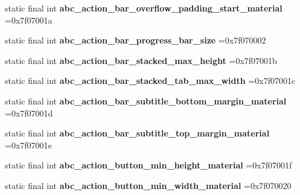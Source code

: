 \begin{DoxyCompactItemize}
\item 
\hypertarget{classcheck_1_1test_1_1_r_1_1dimen_ad969da99713b581daab3061d6db8a49b}{}static final int {\bfseries abc\+\_\+action\+\_\+bar\+\_\+overflow\+\_\+padding\+\_\+start\+\_\+material} =0x7f07001a\label{classcheck_1_1test_1_1_r_1_1dimen_ad969da99713b581daab3061d6db8a49b}

\item 
\hypertarget{classcheck_1_1test_1_1_r_1_1dimen_a2d21081705d41c257d4572203da96a5a}{}static final int {\bfseries abc\+\_\+action\+\_\+bar\+\_\+progress\+\_\+bar\+\_\+size} =0x7f070002\label{classcheck_1_1test_1_1_r_1_1dimen_a2d21081705d41c257d4572203da96a5a}

\item 
\hypertarget{classcheck_1_1test_1_1_r_1_1dimen_aee9ed59153261299d47b8fa9679c329e}{}static final int {\bfseries abc\+\_\+action\+\_\+bar\+\_\+stacked\+\_\+max\+\_\+height} =0x7f07001b\label{classcheck_1_1test_1_1_r_1_1dimen_aee9ed59153261299d47b8fa9679c329e}

\item 
\hypertarget{classcheck_1_1test_1_1_r_1_1dimen_ad12adb5628a570288d2af64a4c55f616}{}static final int {\bfseries abc\+\_\+action\+\_\+bar\+\_\+stacked\+\_\+tab\+\_\+max\+\_\+width} =0x7f07001c\label{classcheck_1_1test_1_1_r_1_1dimen_ad12adb5628a570288d2af64a4c55f616}

\item 
\hypertarget{classcheck_1_1test_1_1_r_1_1dimen_a35b1ac0612787f9c8948ff2e29625a13}{}static final int {\bfseries abc\+\_\+action\+\_\+bar\+\_\+subtitle\+\_\+bottom\+\_\+margin\+\_\+material} =0x7f07001d\label{classcheck_1_1test_1_1_r_1_1dimen_a35b1ac0612787f9c8948ff2e29625a13}

\item 
\hypertarget{classcheck_1_1test_1_1_r_1_1dimen_ad0d350a19b1df248b6dfd44f41b33ce2}{}static final int {\bfseries abc\+\_\+action\+\_\+bar\+\_\+subtitle\+\_\+top\+\_\+margin\+\_\+material} =0x7f07001e\label{classcheck_1_1test_1_1_r_1_1dimen_ad0d350a19b1df248b6dfd44f41b33ce2}

\item 
\hypertarget{classcheck_1_1test_1_1_r_1_1dimen_acd3e8b26d30f8c6ceebf82f395ac5f39}{}static final int {\bfseries abc\+\_\+action\+\_\+button\+\_\+min\+\_\+height\+\_\+material} =0x7f07001f\label{classcheck_1_1test_1_1_r_1_1dimen_acd3e8b26d30f8c6ceebf82f395ac5f39}

\item 
\hypertarget{classcheck_1_1test_1_1_r_1_1dimen_ac3ca5fd29ae7251134293a59df4d5a5a}{}static final int {\bfseries abc\+\_\+action\+\_\+button\+\_\+min\+\_\+width\+\_\+material} =0x7f070020\label{classcheck_1_1test_1_1_r_1_1dimen_ac3ca5fd29ae7251134293a59df4d5a5a}


\end{DoxyCompactItemize}

